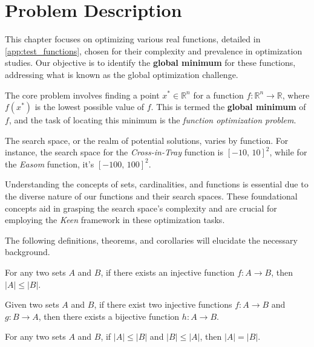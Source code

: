 \section{Problem Description}
\label{sec:fn_opt:problem}
    This chapter focuses on optimizing various real functions, detailed in \vref{app:test_functions}, chosen for their 
    complexity and prevalence in optimization studies. Our objective is to identify the \textbf{global minimum} for 
    these functions, addressing what is known as the global optimization challenge.

    The core problem involves finding a point \(x^* \in \mathbb{R}^n\) for a function \(f : \mathbb{R}^n \to 
    \mathbb{R}\), where \(f(x^*)\) is the lowest possible value of \(f\). This is termed the \textbf{global minimum} of 
    \(f\), and the task of locating this minimum is the \textit{function optimization problem}.

    The search space, or the realm of potential solutions, varies by function. For instance, the search space for the 
    \textit{Cross-in-Tray} function is \([-10,\,10]^2\), while for the \textit{Easom} function, it's \([-100,\,100]^2\).

    Understanding the concepts of sets, cardinalities, and functions is essential due to the diverse nature of our 
    functions and their search spaces. These foundational concepts aid in grasping the search space's complexity and 
    are crucial for employing the \textit{Keen} framework in these optimization tasks.
    
    The following definitions, theorems, and corollaries will elucidate the necessary background.

    \begin{definition}
    \label{def:fn_opt:cardinality_inequality}
        For any two sets \(A\) and \(B\), if there exists an injective function \(f : A \to B\), then \(|A| \leq |B|\).
    \end{definition}

    \begin{theorem}
    \label{thm:fn_opt:schroder_bernstein}
        Given two sets \(A\) and \(B\), if there exist two injective functions \(f : A \to B\) and \(g : B \to A\), 
        then there exists a bijective function \(h : A \to B\).
    \end{theorem}

    \begin{corollary}
    \label{cor:fn_opt:cardinality}
        For any two sets \(A\) and \(B\), if \(|A| \leq |B|\) and \(|B| \leq |A|\), then \(|A| = |B|\).
    \end{corollary}

